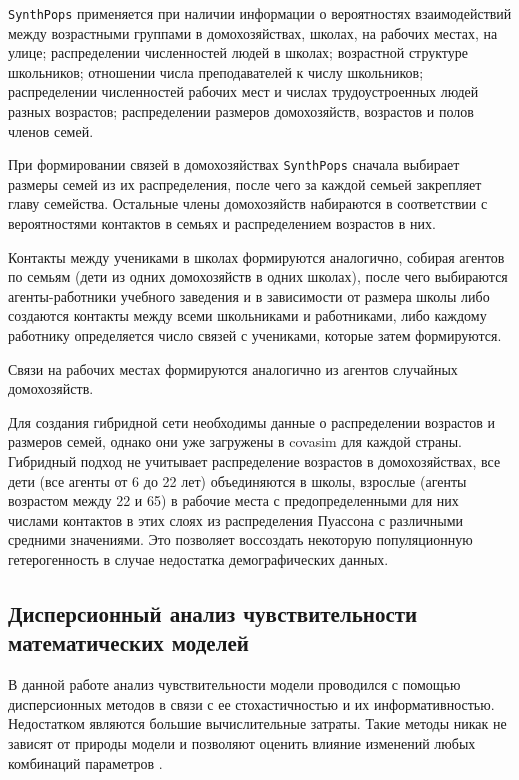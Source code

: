 \documentclass[a4paper,12pt]{article} %
\begin{document}
\texttt{SynthPops} применяется при наличии информации о вероятностях взаимодействий между возрастными группами в домохозяйствах, школах, на рабочих местах, на улице; распределении численностей людей в школах; возрастной структуре школьников; отношении числа преподавателей к числу школьников; распределении численностей рабочих мест и числах трудоустроенных людей разных возрастов; распределении размеров домохозяйств, возрастов и полов членов семей. 

При формировании связей в домохозяйствах \texttt{SynthPops} сначала выбирает размеры семей из их распределения, после чего за каждой семьей закрепляет главу семейства. Остальные члены домохозяйств набираются в соответствии с вероятностями контактов в семьях и распределением возрастов в них.

Контакты между учениками в школах формируются аналогично, собирая агентов по семьям (дети из одних домохозяйств в одних школах), после чего выбираются агенты-работники учебного заведения и в зависимости от размера школы либо создаются контакты между всеми школьниками и работниками, либо каждому работнику определяется число связей с учениками, которые затем формируются.

Связи на рабочих местах формируются аналогично из агентов случайных домохозяйств.

Для создания гибридной сети необходимы данные о распределении возрастов и размеров семей, однако они уже загружены в \gls{covasim} для каждой страны. Гибридный подход не учитывает распределение возрастов в домохозяйствах, все дети (все агенты от 6 до 22 лет) объединяются в школы, взрослые (агенты возрастом между 22 и 65) в рабочие места с предопределенными для них числами контактов в этих слоях из распределения Пуассона с различными средними значениями. Это позволяет воссоздать некоторую популяционную гетерогенность в случае недостатка демографических данных.



\subsection{Дисперсионный анализ чувствительности математических моделей}

В данной работе анализ чувствительности модели проводился с помощью дисперсионных методов в связи с ее стохастичностью и их информативностью. Недостатком являются большие вычислительные затраты. Такие методы никак не зависят от природы модели и позволяют оценить влияние изменений любых комбинаций параметров \cite{saltelli2008global}.
\end{document}
